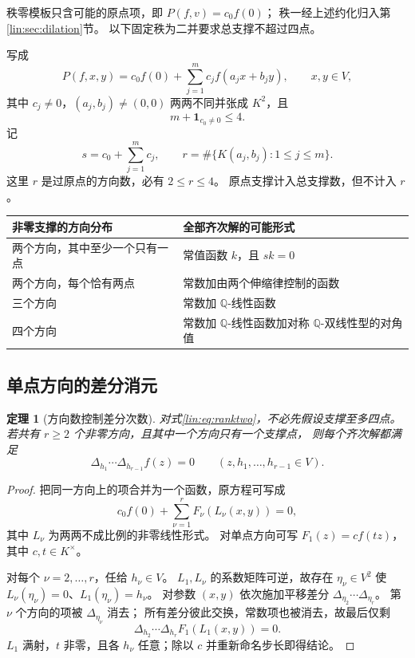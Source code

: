 \documentclass[11pt,a4paper,oneside,openany]{book}
\theoremstyle{lecture}
\newtheorem{theorem}{定理}[section]
\newcommand{\Q}{\mathbb Q}
\numberwithin{equation}{section}
\begin{document}
秩零模板只含可能的原点项，即 $P(f,v)=c_0f(0)$；
秩一经上述约化归入第\ref{lin:sec:dilation}节。
以下固定秩为二并要求总支撑不超过四点。

写成
\begin{equation}\label{lin:eq:ranktwo}
 P(f,x,y)=c_0f(0)+\sum_{j=1}^m c_jf(a_jx+b_jy),
 \qquad x,y\in V,
\end{equation}
其中 $c_j\ne0$，$(a_j,b_j)\ne(0,0)$ 两两不同并张成 $K^2$，且
\[
 m+\mathbf1_{c_0\ne0}\le4.
\]
记
\[
 s=c_0+\sum_{j=1}^m c_j,\qquad
 r=\#\{K(a_j,b_j):1\le j\le m\}.
\]
这里 $r$ 是过原点的方向数，必有 $2\le r\le4$。
原点支撑计入总支撑数，但不计入 $r$。

\begin{center}
\begin{tabular}{p{.40\linewidth}p{.50\linewidth}}
\toprule
非零支撑的方向分布 & 全部齐次解的可能形式\\
\midrule
两个方向，其中至少一个只有一点 & 常值函数 $k$，且 $sk=0$\\
两个方向，每个恰有两点 & 常数加由两个伸缩律控制的函数\\
三个方向 & 常数加 $\Q$-线性函数\\
四个方向 & 常数加 $\Q$-线性函数加对称 $\Q$-双线性型的对角值\\
\bottomrule
\end{tabular}
\end{center}

\subsection{单点方向的差分消元}
\begin{theorem}[方向数控制差分次数]\label{lin:thm:singleton}
对式\eqref{lin:eq:ranktwo}，不必先假设支撑至多四点。
若共有 $r\ge2$ 个非零方向，且其中一个方向只有一个支撑点，
则每个齐次解都满足
\begin{equation}\label{lin:eq:directiondifference}
 \Delta_{h_1}\cdots\Delta_{h_{r-1}}f(z)=0
 \qquad(z,h_1,\ldots,h_{r-1}\in V).
\end{equation}
\end{theorem}
\begin{proof}
把同一方向上的项合并为一个函数，原方程可写成
\[
 c_0f(0)+\sum_{\nu=1}^rF_\nu(L_\nu(x,y))=0,
\]
其中 $L_\nu$ 为两两不成比例的非零线性形式。
对单点方向可写 $F_1(z)=cf(tz)$，其中 $c,t\in K^\times$。

对每个 $\nu=2,\ldots,r$，任给 $h_\nu\in V$。
$L_1,L_\nu$ 的系数矩阵可逆，故存在 $\eta_\nu\in V^2$ 使
$L_\nu(\eta_\nu)=0$、$L_1(\eta_\nu)=h_\nu$。
对参数 $(x,y)$ 依次施加平移差分
$\Delta_{\eta_2}\cdots\Delta_{\eta_r}$。
第 $\nu$ 个方向的项被 $\Delta_{\eta_\nu}$ 消去；
所有差分彼此交换，常数项也被消去，故最后仅剩
\[
 \Delta_{h_2}\cdots\Delta_{h_r}F_1(L_1(x,y))=0.
\]
$L_1$ 满射，$t$ 非零，且各 $h_\nu$ 任意；除以 $c$ 并重新命名步长即得结论。
\end{proof}
\end{document}
